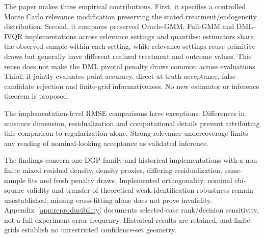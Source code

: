 The paper makes three empirical contributions. First, it specifies a controlled Monte Carlo relevance modification preserving the stated treatment/endogeneity distribution. Second, it compares preserved Oracle-GMM, Full-GMM and DML-IVQR implementations across relevance settings and quantiles: estimators share the observed sample within each setting, while relevance settings reuse primitive draws but generally have different realized treatment and outcome values. This reuse does not make the DML pivotal penalty draws common across evaluations. Third, it jointly evaluates point accuracy, direct-at-truth acceptance, false-candidate rejection and finite-grid informativeness. No new estimator or inference theorem is proposed.

The implementation-level RMSE comparisons have exceptions. Differences in nuisance dimension, residualization and computational details prevent attributing this comparison to regularization alone. Strong-relevance undercoverage limits any reading of nominal-looking acceptance as validated inference.

The findings concern one DGP family and historical implementations with a non-finite mixed residual density, density proxies, differing residualization, same-sample fits and fresh penalty draws. Implemented orthogonality, nominal chi-square validity and transfer of theoretical weak-identification robustness remain unestablished; missing cross-fitting alone does not prove invalidity. Appendix~\ref{app:reproducibility} documents selected-case rank/decision sensitivity, not a full-experiment error frequency. Historical results are retained, and finite grids establish no unrestricted confidence-set geometry.
